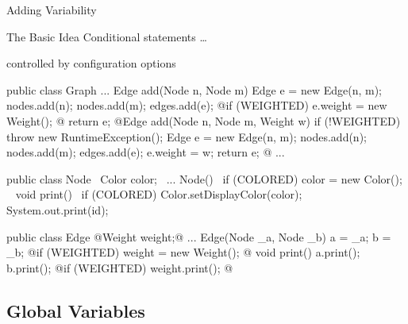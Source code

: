 \begin{frame}[fragile]{Adding Variability}
	\begin{mycolumns}
		\begin{definition}{The Basic Idea}
			Conditional statements \ldots

			controlled by configuration options
		\end{definition}
\begin{tiny}
\begin{codetight}{}
public class Graph {
	...
	Edge add(Node n, Node m) {
		Edge e = new Edge(n, m);
		nodes.add(n); nodes.add(m); edges.add(e);
		@if (WEIGHTED) { e.weight = new Weight(); }@
		return e;
	}
	@Edge add(Node n, Node m, Weight w) {
		if (!WEIGHTED) { throw new RuntimeException(); }
		Edge e = new Edge(n, m);
		nodes.add(n); nodes.add(m); edges.add(e);
		e.weight = w;
		return e;
	}@
	...
}
\end{codetight}
\end{tiny}	
	\mynextcolumn
\begin{tiny}
\begin{codetight}{}
public class Node {
	~Color color;~
	...
	Node(){
		~if (COLORED) { color = new Color(); }~
	}
	void print() {
		~if (COLORED) { Color.setDisplayColor(color); }~
		System.out.print(id);
	}
}
\end{codetight}
\begin{codetight}{}
public class Edge {
	@Weight weight;@ 
	...
	Edge(Node _a, Node _b) {
		a = _a; b = _b;
		@if (WEIGHTED) { weight = new Weight(); }@
	}
	void print() {
		a.print(); b.print();
		@if (WEIGHTED) { weight.print(); }@
	}
}
\end{codetight}
\end{tiny}	
	\end{mycolumns}
\end{frame}

\subsection{Global Variables}

